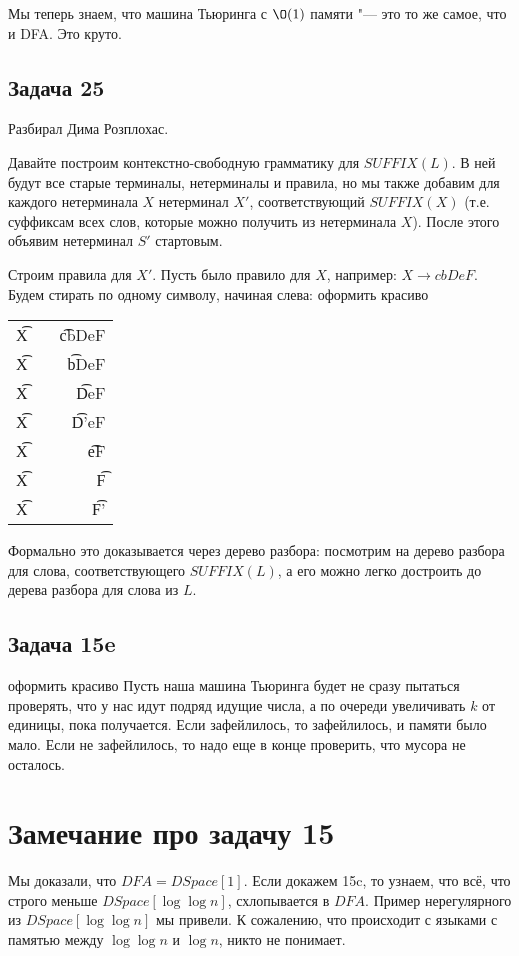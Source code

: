 	\begin{Rem}
		Мы теперь знаем, что машина Тьюринга с $\O(1)$ памяти "--- это то же самое,
		что и DFA.
		Это круто.
	\end{Rem}

\subsection{Задача 25}
	Разбирал Дима Розплохас.

	Давайте построим контекстно-свободную грамматику для $SUFFIX(L)$.
	В ней будут все старые терминалы, нетерминалы и правила, но мы также
	добавим для каждого нетерминала $X$ нетерминал $X'$, соответствующий $SUFFIX(X)$
	(т.е. суффиксам всех слов, которые можно получить из нетерминала $X$).
	После этого объявим нетерминал $S'$ стартовым.

	Строим правила для $X'$.
	Пусть было правило для $X$, например: $X \to cbDeF$.
	Будем стирать по одному символу, начиная слева:
	\TODO оформить красиво
	\begin{tabular}{rcr}
		\t{X} &\to& \t{cbDeF} \\
		\t{X} &\to&  \t{bDeF} \\
		\t{X} &\to&   \t{DeF} \\
		\t{X} &\to&  \t{D'eF} \\
		\t{X} &\to&    \t{eF} \\
		\t{X} &\to&     \t{F} \\
		\t{X} &\to&    \t{F'} \\
	\end{tabular}
	Формально это доказывается через дерево разбора: посмотрим на дерево разбора для слова,
	соответствующего $SUFFIX(L)$, а его можно легко достроить до дерева разбора для слова из $L$.

\subsection{Задача 15e}
	\TODO оформить красиво
	Пусть наша машина Тьюринга будет не сразу пытаться проверять, что у нас идут подряд идущие числа,
	а по очереди увеличивать $k$ от единицы, пока получается.
	Если зафейлилось, то зафейлилось, и памяти было мало.
	Если не зафейлилось, то надо еще в конце проверить, что мусора не осталось.

\section{Замечание про задачу 15}
	Мы доказали, что $DFA=DSpace[1]$.
	Если докажем 15c, то узнаем, что всё, что строго меньше $DSpace[\log \log n]$,
	схлопывается в $DFA$.
	Пример нерегулярного из $DSpace[\log \log n]$ мы привели.
	К сожалению, что происходит с языками с памятью между $\log \log n$ и $\log n$, никто не понимает.
